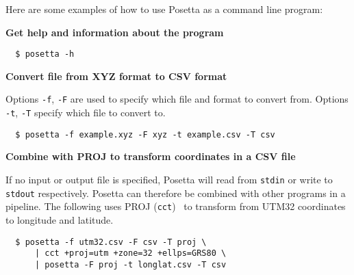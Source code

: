 Here are some examples of how to use Posetta as a command line program:

\textbf{Get help and information about the program}

\begin{verbatim}
  $ posetta -h
\end{verbatim}

\textbf{Convert file from XYZ format to CSV format}

Options \texttt{-f}, \texttt{-F} are used to specify which file and format to convert from. Options \texttt{-t}, \texttt{-T} specify which file to convert to.

\begin{verbatim}
  $ posetta -f example.xyz -F xyz -t example.csv -T csv
\end{verbatim}

\textbf{Combine with PROJ to transform coordinates in a CSV file}

If no input or output file is specified, Posetta will read from \texttt{stdin} or write to \texttt{stdout} respectively. Posetta can therefore be combined with other programs in a pipeline. The following uses PROJ (\texttt{cct})~\cite{proj} to transform from UTM32 coordinates to longitude and latitude.

\begin{verbatim}
  $ posetta -f utm32.csv -F csv -T proj \
      | cct +proj=utm +zone=32 +ellps=GRS80 \
      | posetta -F proj -t longlat.csv -T csv
\end{verbatim}

\endinput
